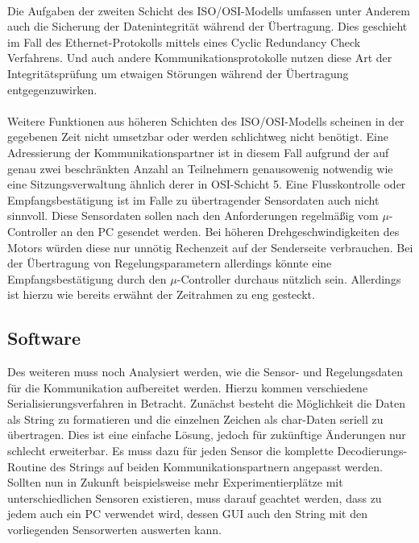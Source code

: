 \paragraph{}
Die Aufgaben der zweiten Schicht des ISO/OSI-Modells umfassen unter Anderem auch die Sicherung der Datenintegrität während der Übertragung. Dies geschieht im Fall des Ethernet-Protokolls mittels eines Cyclic Redundancy Check Verfahrens. Und auch andere Kommunikationsprotokolle nutzen diese Art der Integritätsprüfung um etwaigen Störungen während der Übertragung entgegenzuwirken.
\paragraph{}
Weitere Funktionen aus höheren Schichten des ISO/OSI-Modells scheinen in der gegebenen Zeit nicht umsetzbar oder werden schlichtweg nicht benötigt. Eine Adressierung der Kommunikationspartner ist in diesem Fall aufgrund der auf genau zwei beschränkten Anzahl an Teilnehmern genausowenig notwendig wie eine Sitzungsverwaltung ähnlich derer in OSI-Schicht 5. Eine Flusskontrolle oder Empfangsbestätigung ist im Falle zu übertragender Sensordaten auch nicht sinnvoll. Diese Sensordaten sollen nach den Anforderungen regelmäßig vom $\mu$-Controller an den PC gesendet werden. Bei höheren Drehgeschwindigkeiten des Motors würden diese nur unnötig Rechenzeit auf der Senderseite verbrauchen. Bei der Übertragung von Regelungsparametern allerdings könnte eine Empfangsbestätigung durch den $\mu$-Controller durchaus nützlich sein. Allerdings ist hierzu wie bereits erwähnt der Zeitrahmen zu eng gesteckt.
\subsection{Software}
Des weiteren muss noch Analysiert werden, wie die Sensor- und Regelungsdaten für die Kommunikation aufbereitet werden. Hierzu kommen verschiedene Serialisierungsverfahren in Betracht. Zunächst besteht die Möglichkeit die Daten als String zu formatieren und die einzelnen Zeichen als char-Daten seriell zu übertragen. Dies ist eine einfache Lösung, jedoch für zukünftige Änderungen nur schlecht erweiterbar. Es muss dazu für jeden Sensor die komplette Decodierungs-Routine des Strings auf beiden Kommunikationspartnern angepasst werden. Sollten nun in Zukunft beispielsweise mehr Experimentierplätze mit unterschiedlichen Sensoren existieren, muss darauf geachtet werden, dass zu jedem auch ein PC verwendet wird, dessen GUI auch den String mit den vorliegenden Sensorwerten auswerten kann.
